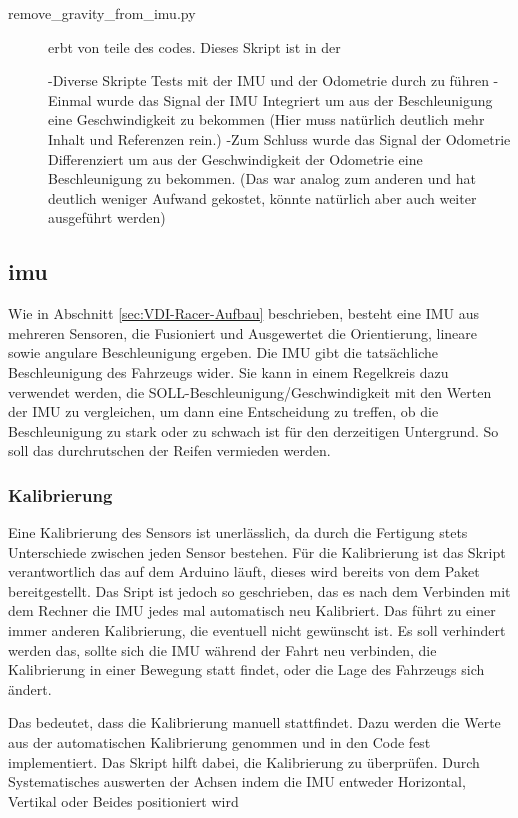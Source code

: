 \begin{description}
\item[remove\_gravity\_from\_imu.py] erbt von  teile des codes. Dieses Skript ist in der 


-Diverse Skripte Tests mit der IMU und der Odometrie durch zu führen
-Einmal wurde das Signal der IMU Integriert um aus der Beschleunigung eine Geschwindigkeit zu bekommen (Hier muss natürlich deutlich mehr Inhalt und Referenzen
rein.)
-Zum Schluss wurde das Signal der Odometrie Differenziert um aus der Geschwindigkeit
der Odometrie eine Beschleunigung zu bekommen. (Das war analog zum anderen und
hat deutlich weniger Aufwand gekostet, könnte natürlich aber auch weiter ausgeführt
werden)

\end{description}

\subsection{imu}
\label{sec:imu}
Wie in Abschnitt \ref{sec:VDI-Racer-Aufbau} beschrieben, besteht eine IMU aus mehreren Sensoren, die Fusioniert und Ausgewertet die Orientierung, lineare sowie angulare Beschleunigung ergeben. Die IMU gibt die tatsächliche Beschleunigung des Fahrzeugs wider. Sie kann in einem Regelkreis dazu verwendet werden, die SOLL-Beschleunigung/Geschwindigkeit mit den Werten der IMU zu vergleichen, um dann eine Entscheidung zu treffen, ob die Beschleunigung zu stark oder zu schwach ist für den derzeitigen Untergrund. So soll das durchrutschen der Reifen vermieden werden.

\subsubsection{Kalibrierung}
\label{sec:KalibrierungImu}
Eine Kalibrierung des Sensors ist unerlässlich, da durch die Fertigung stets Unterschiede zwischen jeden Sensor bestehen. Für die Kalibrierung ist das Skript verantwortlich das auf dem Arduino läuft, dieses wird bereits von dem  Paket bereitgestellt. Das Sript ist jedoch so geschrieben, das es nach dem Verbinden mit dem Rechner die IMU jedes mal automatisch neu Kalibriert. Das führt zu einer immer anderen Kalibrierung, die eventuell nicht gewünscht ist. Es soll verhindert werden das, sollte sich die IMU während der Fahrt neu verbinden, die Kalibrierung in einer Bewegung statt findet, oder die Lage des Fahrzeugs sich ändert. 

Das bedeutet, dass die Kalibrierung manuell stattfindet. Dazu werden die Werte aus der automatischen Kalibrierung genommen und in den Code fest implementiert. Das  Skript hilft dabei, die Kalibrierung zu überprüfen. Durch Systematisches auswerten der Achsen indem die IMU entweder Horizontal, Vertikal oder Beides positioniert wird

